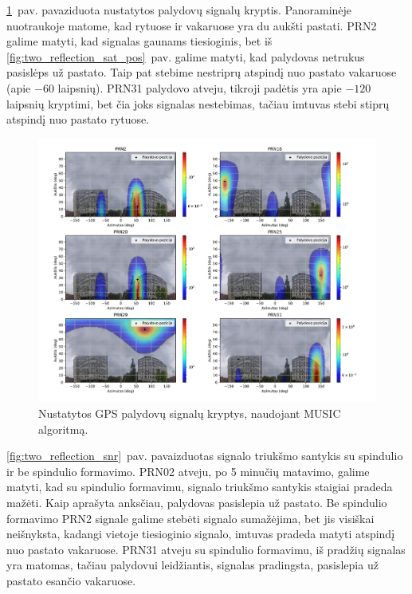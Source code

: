 \documentclass[main.tex]{subfiles}
\begin{document}
\ref{fig:two_reflection}~pav. pavaziduota nustatytos palydovų signalų kryptis.
Panoraminėje nuotraukoje matome, kad rytuose ir vakaruose yra du aukšti pastati.
PRN2 galime matyti, kad signalas gaunams tiesioginis, bet iš
\ref{fig:two_reflection_sat_pos}~pav. galime matyti, kad palydovas netrukus
pasislėps už pastato. Taip pat stebime nestriprų atspindį nuo pastato vakaruose
(apie $-60$ laipsnių). PRN31 palydovo atveju, tikroji padėtis yra apie $-120$
laipsnių kryptimi, bet čia joks signalas nestebimas, tačiau imtuvas stebi stiprų
atspindį nuo pastato rytuose.

\begin{figure}[ht]
    \begin{centering}
    \includegraphics[scale=0.50]{drawings/two_reflections}
    \par\end{centering}
    \protect\caption{\label{fig:two_reflection}Nustatytos GPS palydovų signalų kryptys, naudojant MUSIC algoritmą.}
\end{figure}

\ref{fig:two_reflection_snr}~pav. pavaizduotas signalo triukšmo santykis su spindulio
ir be spindulio formavimo.  PRN02 atveju, po 5 minučių matavimo, galime
matyti, kad su spindulio formavimu,
signalo triukšmo santykis staigiai pradeda mažėti. Kaip aprašyta anksčiau, palydovas
pasislepia už pastato. Be spindulio formavimo PRN2 signale galime
stebėti signalo sumažėjima, bet jis visiškai neišnyksta, kadangi
vietoje tiesioginio signalo, imtuvas pradeda matyti atspindį nuo pastato vakaruose.
PRN31 atveju su spindulio formavimu, iš pradžių signalas yra matomas, tačiau palydovui
leidžiantis, signalas pradingsta, pasislepia už pastato esančio vakaruose.
\end{document}
